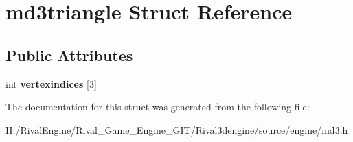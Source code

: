 \hypertarget{structmd3triangle}{}\section{md3triangle Struct Reference}
\label{structmd3triangle}
\subsection*{Public Attributes}
\begin{DoxyCompactItemize}
\item 
\mbox{\label{structmd3triangle_ab31fed7b667a019920e262875d43fba2}} 
int {\bfseries vertexindices} \mbox{[}3\mbox{]}
\end{DoxyCompactItemize}


The documentation for this struct was generated from the following file\+:\begin{DoxyCompactItemize}
\item 
H\+:/\+Rival\+Engine/\+Rival\+\_\+\+Game\+\_\+\+Engine\+\_\+\+G\+I\+T/\+Rival3dengine/source/engine/md3.\+h\end{DoxyCompactItemize}
